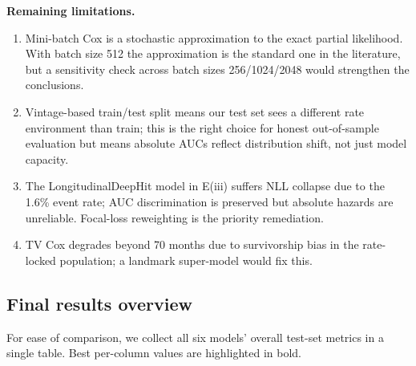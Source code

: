 \documentclass[11pt,a4paper]{article}
\begin{document}
\textbf{Remaining limitations.}
\begin{enumerate}[leftmargin=1.5em,itemsep=2pt,topsep=2pt]
  \item Mini-batch Cox is a stochastic approximation to the exact partial likelihood. With batch size 512 the approximation is the standard one in the literature, but a sensitivity check across batch sizes 256/1024/2048 would strengthen the conclusions.
  \item Vintage-based train/test split means our test set sees a different rate environment than train; this is the right choice for honest out-of-sample evaluation but means absolute AUCs reflect distribution shift, not just model capacity.
  \item The LongitudinalDeepHit model in E(iii) suffers NLL collapse due to the 1.6\% event rate; AUC discrimination is preserved but absolute hazards are unreliable. Focal-loss reweighting is the priority remediation.
  \item TV Cox degrades beyond 70 months due to survivorship bias in the rate-locked population; a landmark super-model would fix this.
\end{enumerate}

\subsection{Final results overview}

For ease of comparison, we collect all six models' overall test-set metrics in a single table. Best per-column values are highlighted in bold.
\end{document}
